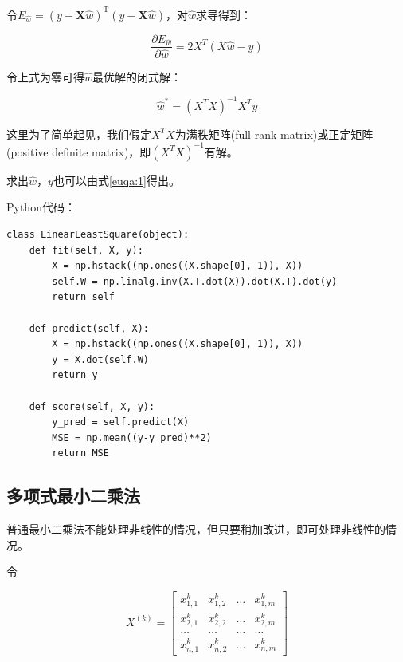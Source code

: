 \documentclass{article}
\begin{document}
令$E_{\hat{{w}}}=({y}-\mathbf{X} \hat{{w}})^{\mathrm{T}}({y}-\mathbf{X} \hat{{w}})$，对$\hat{w}$求导得到：

\begin{equation}
\frac{\partial E_{\hat{{w}}}}{\partial \hat{{w}}}=2 {X}^{{T}}({X} \hat{{w}}-{y})
\end{equation}

令上式为零可得$\hat{w}$最优解的闭式解：

\begin{equation}
\hat{{w}}^{*}=\left({X}^{{T}} {X}\right)^{-1} {X}^{{T}} {y}
\end{equation}

这里为了简单起见，我们假定$X^TX$为满秩矩阵(full-rank matrix)或正定矩阵(positive definite matrix)，即$(X^TX)^{-1}$有解。

求出$\hat{w}$，$y$也可以由式\ref{euqa:1}得出。

Python代码：

\begin{lstlisting}[title={最小二乘法代码}]
class LinearLeastSquare(object):
    def fit(self, X, y):
        X = np.hstack((np.ones((X.shape[0], 1)), X))
        self.W = np.linalg.inv(X.T.dot(X)).dot(X.T).dot(y)
        return self

    def predict(self, X):
        X = np.hstack((np.ones((X.shape[0], 1)), X))
        y = X.dot(self.W)
        return y

    def score(self, X, y):
        y_pred = self.predict(X)
        MSE = np.mean((y-y_pred)**2)
        return MSE
\end{lstlisting}

\subsection{多项式最小二乘法}

普通最小二乘法不能处理非线性的情况，但只要稍加改进，即可处理非线性的情况。

令

\begin{equation}
	X^{(k)}=\left[\begin{array}{cccc} x_{1,1}^k & x_{1,2}^k & {\ldots} & x_{1,m}^k \\ x_{2,1}^k & x_{2,2}^k & {\ldots} & x_{2,m}^k \\ {\ldots} & {\ldots} & {\ldots} & {\ldots} \\ x_{n,1}^k & x_{n,2}^k & {\ldots} & x_{n,m}^k\end{array}\right]
\end{equation}
\end{document}
